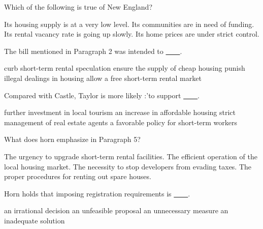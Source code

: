 \item Which of the following is true of New England?
\begin{tasks}
	\task Its housing supply is at a very low level.
	\task Its communities are in need of funding.
	\task Its rental vacancy rate is going up slowly.
	\task Its home prices are under strict control.
\end{tasks}
\item The bill mentioned in Paragraph 2 was intended to \uline{~~~~}.
\begin{tasks}
	\task curb short-term rental speculation
	\task ensure the supply of cheap housing
	\task punish illegal dealings in housing
	\task allow a free short-term rental market
\end{tasks}
\item Compared with Castle, Taylor is more likely :'to support \uline{~~~~}.
\begin{tasks}
	\task further investment in local tourism
	\task an increase in affordable housing
	\task strict management of real estate agents
	\task a favorable policy for short-term workers
\end{tasks}
\item What does horn emphasize in Paragraph 5?
\begin{tasks}
	\task The urgency to upgrade short-term rental facilities.
	\task The efficient operation of the local housing market.
	\task The necessity to stop developers from evading taxes.
	\task The proper procedures for renting out spare houses.
\end{tasks}
\item Horn holds that imposing registration requirements is \uline{~~~~}.
\begin{tasks}
	\task an irrational decision
	\task an unfeasible proposal
	\task an unnecessary measure
	\task an inadequate solution
\end{tasks}
